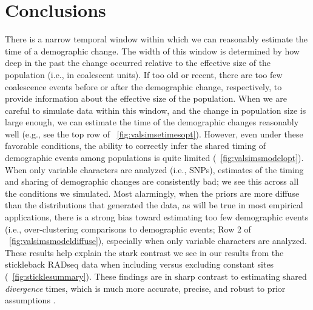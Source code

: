 

\section{Conclusions}

There is a narrow temporal window within which we can reasonably estimate the
time of a demographic change.
The width of this window is determined by how deep in the past the change
occurred relative to the effective size of the population (i.e., in coalescent
units).
If too old or recent, there are too few coalescence events before or after the
demographic change, respectively, to provide information about the effective
size of the population.
When we are careful to simulate data within this window, and the change in
population size is large enough, we can estimate the time of the demographic
changes reasonably well
(e.g., see the top row of \fig{}~\ref{fig:valsimsetimesopt}).
However, even under these favorable conditions, the ability to correctly infer
the shared timing of demographic events among populations is quite limited
(\fig{}~\ref{fig:valsimsmodelopt}).
When only variable characters are analyzed (i.e., SNPs), estimates of the
timing and sharing of demographic changes are consistently bad; we see this
across all the conditions we simulated.
Most alarmingly, when the priors are more diffuse than the distributions that
generated the data, as will be true in most empirical applications, there is a
strong bias toward estimating too few demographic events
(i.e., over-clustering comparisons to demographic events;
Row 2 of \fig{}~\ref{fig:valsimsmodeldiffuse}),
especially when only variable characters are analyzed.
These results help explain the stark contrast we see in our results from the
stickleback RADseq data when including versus excluding constant sites
(\fig{}~\ref{fig:sticklesummary}).
These findings are in sharp contrast to estimating shared \emph{divergence}
times, which is much more accurate, precise, and robust to prior assumptions
\citep[\figs {};][]{Oaks2018ecoevolity,Oaks2018paic}.

